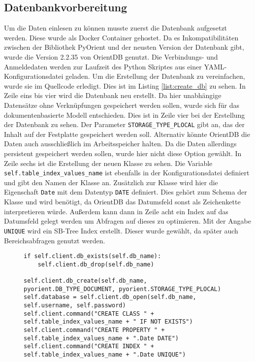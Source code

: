 
\subsection{Datenbankvorbereitung}

Um die Daten einlesen zu können musste zuerst die Datenbank aufgesetzt werden. Diese wurde als Docker Container gehostet. Da es Inkompatibilitäten zwischen der Bibliothek PyOrient und der neusten Version der Datenbank gibt, wurde die Version 2.2.35 von OrientDB genutzt. Die Verbindungs- und Anmeldedaten werden zur Laufzeit des Python Skriptes aus einer \gls{YAML}-Konfigurationsdatei geladen. Um die Erstellung der Datenbank zu vereinfachen, wurde sie im Quellcode erledigt. Dies ist im Listing \ref{list:create_db} zu sehen. In Zeile eins bis vier wird die Datenbank neu erstellt. Da hier unabhängige Datensätze ohne Verknüpfungen gespeichert werden sollen, wurde sich für das dokumentenbasierte Modell entschieden. Dies ist in Zeile vier bei der Erstellung der Datenbank zu sehen. Der Parameter \texttt{STORAGE\_TYPE\_PLOCAL} gibt an, das der Inhalt auf der Festplatte gespeichert werden soll. Alternativ könnte OrientDB die Daten auch ausschließlich im Arbeitsspeicher halten. Da die Daten allerdings persistent gespeichert werden sollen, wurde hier nicht diese Option gewählt. In Zeile sechs ist die Erstellung der neuen Klasse zu sehen. Die Variable \texttt{self.table\_index\_values\_name} ist ebenfalls in der Konfigurationsdatei definiert und gibt den Namen der Klasse an. Zusätzlich zur Klasse wird hier die Eigenschaft \texttt{Date} mit dem Datentyp \texttt{DATE} definiert. Dies gehört zum Schema der Klasse und wird benötigt, da OrientDB das Datumsfeld sonst als Zeichenkette interpretieren würde. Außerdem kann dann in Zeile acht ein Index auf das Datumsfeld gelegt werden um Abfragen auf dieses zu optimieren. Mit der Angabe \texttt{UNIQUE} wird ein SB-Tree Index erstellt. Dieser wurde gewählt, da später auch Bereichsabfragen genutzt werden.

\begin{figure}[!htb]
    \begin{lstlisting}[caption=Anlegen und initialiseren einer Datenbank in Python, label=list:create_db]
if self.client.db_exists(self.db_name):
    self.client.db_drop(self.db_name)

self.client.db_create(self.db_name, pyorient.DB_TYPE_DOCUMENT, pyorient.STORAGE_TYPE_PLOCAL)
self.database = self.client.db_open(self.db_name, self.username, self.password)
self.client.command("CREATE CLASS " + self.table_index_values_name + " IF NOT EXISTS")
self.client.command("CREATE PROPERTY " + self.table_index_values_name + ".Date DATE")
self.client.command("CREATE INDEX " + self.table_index_values_name + ".Date UNIQUE")
    \end{lstlisting}
\end{figure}

